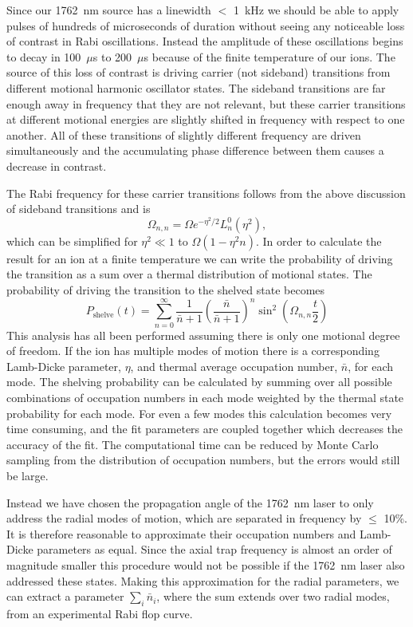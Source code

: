 Since our 1762~nm source has a linewidth $<$ 1~kHz we should be able to apply pulses of hundreds of microseconds of duration without seeing any noticeable loss of contrast in Rabi oscillations.  Instead the amplitude of these oscillations begins to decay in 100~$\mu$s to 200~$\mu$s because of the finite temperature of our ions.  The source of this loss of contrast is driving carrier (not sideband) transitions from different motional harmonic oscillator states.  The sideband transitions are far enough away in frequency that they are not relevant, but these carrier transitions at different motional energies are slightly shifted in frequency with respect to one another.  All of these transitions of slightly different frequency are driven simultaneously and the accumulating phase difference between them causes a decrease in contrast.

The Rabi frequency for these carrier transitions follows from the above discussion of sideband transitions and is
\begin{equation}
	\Omega_{n,n} = \Omega e^{-\eta^2/2} L_n^0 ( \eta^2 ) \mathrm{,}
\end{equation}
which can be simplified for $\eta^2 \ll 1$ to $\Omega ( 1 - \eta^2 n )$.  In order to calculate the result for an ion at a finite temperature we can write the probability of driving the transition as a sum over a thermal distribution of motional states. The probability of driving the transition to the shelved state becomes
\begin{equation}
P_\mathrm{shelve} (t) = \sum\limits_{n=0}^{\infty} \frac{1}{\bar{n} + 1} \left( \frac{\bar{n}}{\bar{n} + 1} \right) ^n \sin^2 \left( \Omega_{n,n}  \frac{t}{2} \right) 
\end{equation}
This analysis has all been performed assuming there is only one motional degree of freedom.  If the ion has multiple modes of motion there is a corresponding Lamb-Dicke parameter, $\eta$, and thermal average occupation number, $\bar{n}$, for each mode.  The shelving probability can be calculated by summing over all possible combinations of occupation numbers in each mode weighted by the thermal state probability for each mode.  For even a few modes this calculation becomes very time consuming, and the fit parameters are coupled together which decreases the accuracy of the fit.  The computational time can be reduced by Monte Carlo sampling from the distribution of occupation numbers, but the errors would still be large.

Instead we have chosen the propagation angle of the 1762~nm laser to only address the radial modes of motion, which are separated in frequency by $\le$ 10\%.  It is therefore reasonable to approximate their occupation numbers and Lamb-Dicke parameters as equal.  Since the axial trap frequency is almost an order of magnitude smaller this procedure would not be possible if the 1762~nm laser also addressed these states.  Making this approximation for the radial parameters, we can extract a parameter $\sum_i \bar{n}_i$, where the sum extends over two radial modes, from an experimental Rabi flop curve.

